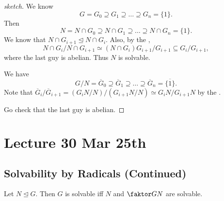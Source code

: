 \documentclass[notoc,notitlepage,nobib]{tufte-book}
\begin{document}
\begin{proof}[sketch]
  We know
  \begin{equation*}
    G = G_0 \supseteq G_1 \supseteq \hdots \supseteq G_n =\{1\}.
  \end{equation*}
  Then
  \begin{equation*}
    N = N \cap G_0 \supseteq N \cap G_1 \supseteq \hdots \supseteq N \cap G_n =
    \{ 1 \}.
  \end{equation*}
  We know that $N \cap G_{i+1} \trianglelefteq N \cap G_i$. Also, by the
   ,
  \begin{equation*}
    N \cap G_i / N \cap G_{i+1} \simeq (N \cap G_i) G_{i+1} / G_{i+1} \subseteq
    G_i / G_{i+1},
  \end{equation*}
  where the last guy is abelian. Thus $N$ is solvable.

  We have
  \begin{equation*}
    G / N = \overline{G}_0 \supseteq \overline{G}_1 \supseteq \hdots
    \supseteq \overline{G}_n = \overline{\{1\}}.
  \end{equation*}
  Note that $\overline{G}_i / \overline{G}_{i+1} = \left( G_i N / N \right) /
  \left( G_{i+1} N / N \right) \simeq G_i N / G_{i+1} N$ by the .

  Go check that the last guy is abelian.
\end{proof}




\chapter{Lecture 30 Mar 25th}%
\label{chp:lecture_30_mar_25th}

\section{Solvability by Radicals (Continued)}%
\label{sec:solvability_by_radicals_continued}

\begin{propo}\label{propo:converse_of_subgroups_of_solvable_groups_are_solvable}
  Let $N \trianglelefteq G$. Then $G$ is solvable iff $N$ and $\quotient{G}{N}$
  are solvable.
\end{propo}
\end{document}
